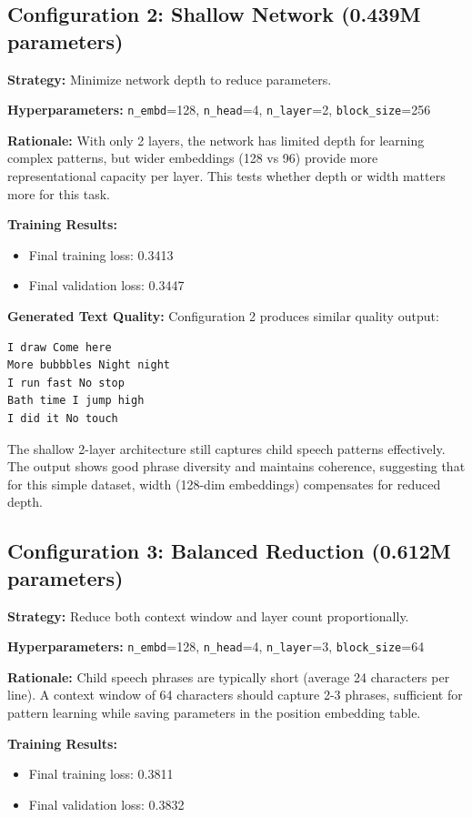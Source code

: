 \documentclass[11pt]{article}
\begin{document}
\subsection*{Configuration 2: Shallow Network (0.439M parameters)}

\textbf{Strategy:} Minimize network depth to reduce parameters.

\textbf{Hyperparameters:} \texttt{n\_embd}=128, \texttt{n\_head}=4, \texttt{n\_layer}=2, \texttt{block\_size}=256

\textbf{Rationale:} With only 2 layers, the network has limited depth for learning complex patterns, but wider embeddings (128 vs 96) provide more representational capacity per layer. This tests whether depth or width matters more for this task.

\textbf{Training Results:}
\begin{itemize}
    \item Final training loss: 0.3413
    \item Final validation loss: 0.3447
\end{itemize}

\textbf{Generated Text Quality:} Configuration 2 produces similar quality output:
\begin{verbatim}
I draw Come here
More bubbbles Night night
I run fast No stop
Bath time I jump high
I did it No touch
\end{verbatim}
The shallow 2-layer architecture still captures child speech patterns effectively. The output shows good phrase diversity and maintains coherence, suggesting that for this simple dataset, width (128-dim embeddings) compensates for reduced depth.

\subsection*{Configuration 3: Balanced Reduction (0.612M parameters)}

\textbf{Strategy:} Reduce both context window and layer count proportionally.

\textbf{Hyperparameters:} \texttt{n\_embd}=128, \texttt{n\_head}=4, \texttt{n\_layer}=3, \texttt{block\_size}=64

\textbf{Rationale:} Child speech phrases are typically short (average 24 characters per line). A context window of 64 characters should capture 2-3 phrases, sufficient for pattern learning while saving parameters in the position embedding table.

\textbf{Training Results:}
\begin{itemize}
    \item Final training loss: 0.3811
    \item Final validation loss: 0.3832
\end{itemize}
\end{document}
